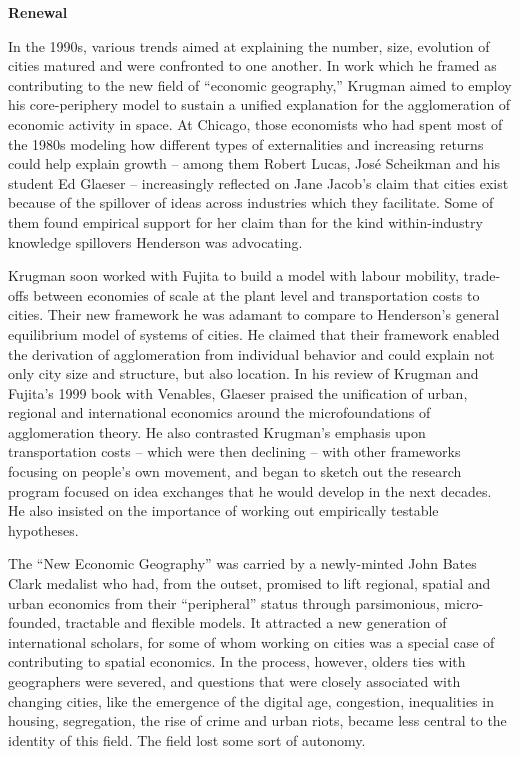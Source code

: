 \documentclass[
]{book}
\begin{document}
\textbf{Renewal}

In the 1990s, various trends aimed at explaining the number, size, evolution of cities matured and were confronted to one another. In work which he framed as contributing to the new field of ``economic geography,'' Krugman aimed to employ his core-periphery model to sustain a unified explanation for the agglomeration of economic activity in space. At Chicago, those economists who had spent most of the 1980s modeling how different types of externalities and increasing returns could help explain growth -- among them Robert Lucas, José Scheikman and his student Ed Glaeser -- increasingly reflected on Jane Jacob's claim that cities exist because of the spillover of ideas across industries which they facilitate. Some of them found empirical support for her claim than for the kind within-industry knowledge spillovers Henderson was advocating.

Krugman soon worked with Fujita to build a model with labour mobility, trade-offs between economies of scale at the plant level and transportation costs to cities. Their new framework he was adamant to compare to Henderson's general equilibrium model of systems of cities. He claimed that their framework enabled the derivation of agglomeration from individual behavior and could explain not only city size and structure, but also location. In his review of Krugman and Fujita's 1999 book with Venables, Glaeser praised the unification of urban, regional and international economics around the microfoundations of agglomeration theory. He also contrasted Krugman's emphasis upon transportation costs -- which were then declining -- with other frameworks focusing on people's own movement, and began to sketch out the research program focused on idea exchanges that he would develop in the next decades. He also insisted on the importance of working out empirically testable hypotheses.

The ``New Economic Geography'' was carried by a newly-minted John Bates Clark medalist who had, from the outset, promised to lift regional, spatial and urban economics from their ``peripheral'' status through parsimonious, micro-founded, tractable and flexible models. It attracted a new generation of international scholars, for some of whom working on cities was a special case of contributing to spatial economics. In the process, however, olders ties with geographers were severed, and questions that were closely associated with changing cities, like the emergence of the digital age, congestion, inequalities in housing, segregation, the rise of crime and urban riots, became less central to the identity of this field. The field lost some sort of autonomy.
\end{document}
